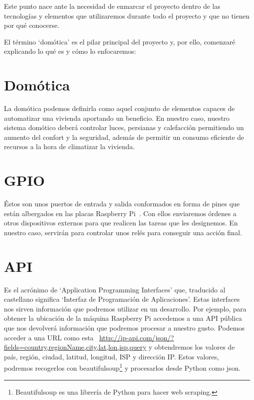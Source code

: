 

Este punto nace ante la necesidad de enmarcar el proyecto dentro de las tecnologías y elementos que utilizaremos durante todo el proyecto y que no tienen por qué conocerse.

El término ‘domótica’ es el pilar principal del proyecto y, por ello, comenzaré explicando lo qué es y cómo lo enfocaremos:

\section{Domótica}
La domótica podemos definirla como aquel conjunto de elementos capaces de automatizar una vivienda aportando un beneficio.
En nuestro caso, nuestro sistema domótico deberá controlar luces, persianas y calefacción permitiendo un aumento del confort y la seguridad, además de permitir un consumo eficiente de recursos a la hora de climatizar la vivienda.

\begin{displayquote}
 \cite{inproceedings:CitaDomotica}
\end{displayquote}

\section{GPIO}
Éstos son unos puertos de entrada y salida conformados en forma de pines que están albergados en las placas Raspberry Pi~\cite{misc:RbPWeb}. Con ellos enviaremos órdenes a otros dispositivos externos para que realicen las tareas que les designemos. En nuestro caso, servirán para controlar unos relés para conseguir una acción final.

\section{API}
Es el acrónimo de ‘Application Programming Interfaces’ que, traducido al castellano significa ‘Interfaz de Programación de Aplicaciones’. Estas interfaces nos sirven información que podremos utilizar en un desarrollo.
Por ejemplo, para obtener la ubicación de la máquina Raspberry Pi accedemos a una API pública que nos devolverá información que podremos procesar a nuestro gusto.
Podemos acceder a una URL como esta ~\url{http://ip-api.com/json/?fields=country,regionName,city,lat,lon,isp,query} y obtendremos los valores de país, región, ciudad, latitud, longitud, ISP y dirección IP.
Estos valores, podremos recogerlos con beautifulsoup\footnote{Beautifulsoup es una librería de Python para hacer web scraping.} y procesarlos desde Python como json.

